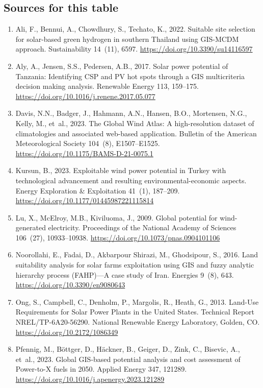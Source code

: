 \documentclass[11pt,a4paper]{article}
\begin{document}
\subsection*{Sources for this table}
\begin{enumerate}\setlength{\itemsep}{0pt}
\item Ali, F., Bennui, A., Chowdhury, S., Techato, K., 2022. Suitable site selection for solar-based green hydrogen in southern Thailand using GIS-MCDM approach. Sustainability 14~(11), 6597. \url{https://doi.org/10.3390/su14116597}
\item Aly, A., Jensen, S.S., Pedersen, A.B., 2017. Solar power potential of Tanzania: Identifying CSP and PV hot spots through a GIS multicriteria decision making analysis. Renewable Energy 113, 159--175. \url{https://doi.org/10.1016/j.renene.2017.05.077}
\item Davis, N.N., Badger, J., Hahmann, A.N., Hansen, B.O., Mortensen, N.G., Kelly, M., et~al., 2023. The Global Wind Atlas: A high-resolution dataset of climatologies and associated web-based application. Bulletin of the American Meteorological Society 104~(8), E1507--E1525. \url{https://doi.org/10.1175/BAMS-D-21-0075.1}
\item Kursun, B., 2023. Exploitable wind power potential in Turkey with technological advancement and resulting environmental-economic aspects. Energy Exploration \& Exploitation 41~(1), 187--209. \url{https://doi.org/10.1177/01445987221115814}
\item Lu, X., McElroy, M.B., Kiviluoma, J., 2009. Global potential for wind-generated electricity. Proceedings of the National Academy of Sciences 106~(27), 10933--10938. \url{https://doi.org/10.1073/pnas.0904101106}
\item Noorollahi, E., Fadai, D., Akbarpour Shirazi, M., Ghodsipour, S., 2016. Land suitability analysis for solar farms exploitation using GIS and fuzzy analytic hierarchy process (FAHP)---A case study of Iran. Energies 9~(8), 643. \url{https://doi.org/10.3390/en9080643}
\item Ong, S., Campbell, C., Denholm, P., Margolis, R., Heath, G., 2013. Land-Use Requirements for Solar Power Plants in the United States. Technical Report NREL/TP-6A20-56290. National Renewable Energy Laboratory, Golden, CO. \url{https://doi.org/10.2172/1086349}
\item Pfennig, M., B{\"o}ttger, D., H{\"a}ckner, B., Geiger, D., Zink, C., Bisevic, A., et~al., 2023. Global GIS-based potential analysis and cost assessment of Power-to-X fuels in 2050. Applied Energy 347, 121289. \url{https://doi.org/10.1016/j.apenergy.2023.121289}

\end{enumerate}
\end{document}
